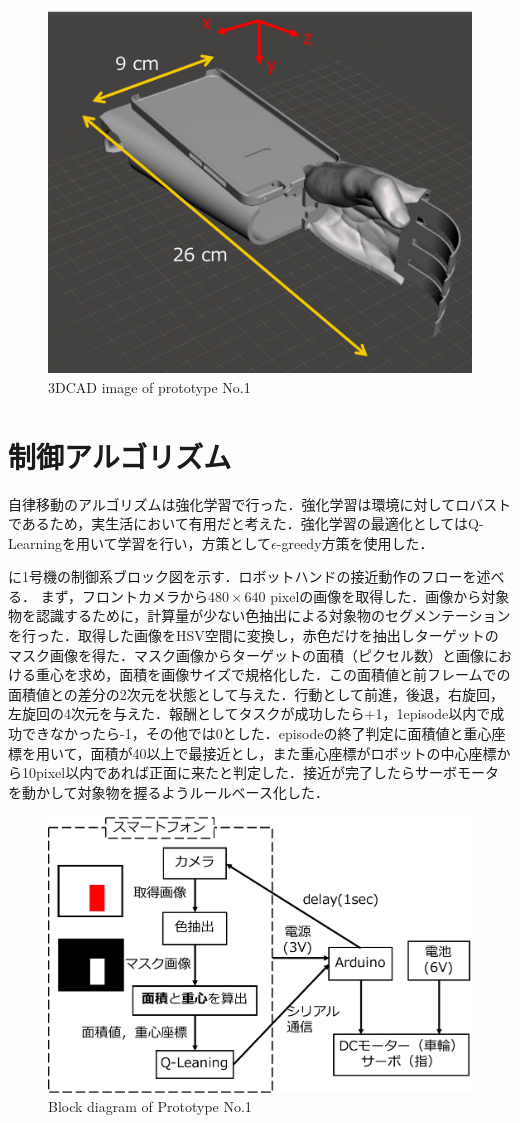 \begin{figure}[H]
    \centering
    \includegraphics[width=0.7\linewidth]{figure/chapter3/1号機CAD-2}
    \caption{3DCAD image of prototype No.1}
    \label{fig:1号機CAD}
\end{figure}


\section{制御アルゴリズム}
自律移動のアルゴリズムは強化学習で行った．強化学習は環境に対してロバストであるため，実生活において有用だと考えた．強化学習の最適化としてはQ-Learningを用いて学習を行い，方策として$\epsilon$-greedy方策を使用した．

に1号機の制御系ブロック図を示す．ロボットハンドの接近動作のフローを述べる．
まず，フロントカメラから$480 \times 640$ pixelの画像を取得した．画像から対象物を認識するために，計算量が少ない色抽出による対象物のセグメンテーションを行った．取得した画像をHSV空間に変換し，赤色だけを抽出しターゲットのマスク画像を得た．マスク画像からターゲットの面積（ピクセル数）と画像における重心を求め，面積を画像サイズで規格化した．この面積値と前フレームでの面積値との差分の2次元を状態として与えた．行動として前進，後退，右旋回，左旋回の4次元を与えた．報酬としてタスクが成功したら+1，1episode以内で成功できなかったら-1，その他では0とした．episodeの終了判定に面積値と重心座標を用いて，面積が40以上で最接近とし，また重心座標がロボットの中心座標から10pixel以内であれば正面に来たと判定した．接近が完了したらサーボモータを動かして対象物を握るようルールベース化した．

\begin{figure}[H]
    \centering
    \includegraphics[width=0.7\linewidth]{figure/chapter3/1号機制御図-2}
    \caption{Block diagram of Prototype No.1}
    \label{fig:1号機制御図}
\end{figure}


